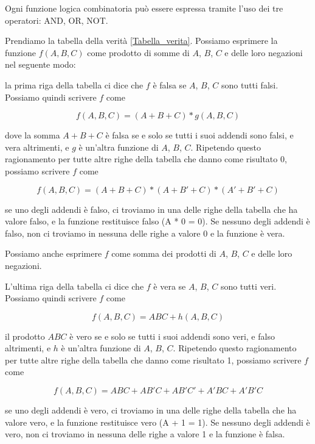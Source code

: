 \documentclass{article}
\begin{document}
\vspace{3mm}

Ogni funzione logica combinatoria può essere espressa tramite l'uso dei tre operatori: AND, OR, NOT.

\vspace{3mm}

Prendiamo la tabella della verità \ref{Tabella_verita}. Possiamo esprimere la funzione $f(A, B, C)$ come prodotto di somme di $A$, $B$, $C$ e delle loro negazioni nel seguente modo:

la prima riga della tabella ci dice che $f$ è falsa se $A$, $B$, $C$ sono tutti falsi. Possiamo quindi scrivere $f$ come

\[f(A, B, C) = (A + B + C) * g(A, B, C)\]

dove la somma $A + B + C$ è falsa se e solo se tutti i suoi addendi sono falsi, e vera altrimenti, e $g$ è un'altra funzione di $A$, $B$, $C$. Ripetendo questo ragionamento per tutte altre righe della tabella che danno come risultato 0, possiamo scrivere $f$ come

\[f(A, B, C) = (A + B + C) * (A + B' + C) * (A' + B' + C)\]

se uno degli addendi è falso, ci troviamo in una delle righe della tabella che ha valore falso, e la funzione restituisce falso (A * 0 = 0). Se nessuno degli addendi è falso, non ci troviamo in nessuna delle righe a valore 0 e la funzione è vera.

\vspace{3mm}

Possiamo anche esprimere $f$ come somma dei prodotti di $A$, $B$, $C$ e delle loro negazioni.

L'ultima riga della tabella ci dice che $f$ è vera se $A$, $B$, $C$ sono tutti veri. Possiamo quindi scrivere $f$ come

\[f(A, B, C) = ABC + h(A, B, C)\]

il prodotto $ABC$ è vero se e solo se tutti i suoi addendi sono veri, e falso altrimenti, e $h$ è un'altra funzione di $A$, $B$, $C$.  Ripetendo questo ragionamento per tutte altre righe della tabella che danno come risultato 1, possiamo scrivere $f$ come

\[f(A, B, C) = ABC + AB'C + AB'C' + A'BC + A'B'C\]

se uno degli addendi è vero, ci troviamo in una delle righe della tabella che ha valore vero, e la funzione restituisce vero (A + 1 = 1). Se nessuno degli addendi è vero, non ci troviamo in nessuna delle righe a valore 1 e la funzione è falsa.
\end{document}
